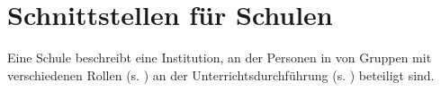 \section{Schnittstellen für Schulen}
Eine Schule beschreibt eine Institution, an der Personen in von Gruppen mit verschiedenen Rollen (s. ) an der Unterrichtsdurchführung (s. ) beteiligt sind. 












